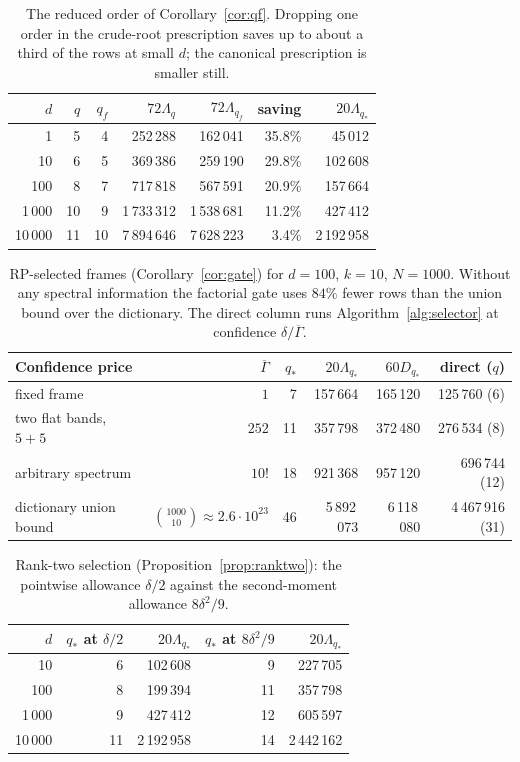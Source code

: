 \documentclass[11pt,a4paper]{article}
\theoremstyle{definition}
\theoremstyle{remark}
\numberwithin{equation}{section}
\begin{document}
\begin{table}[ht]
\centering\small
\begin{tabular}{rrrrrrr}
\toprule
$d$ & $q$ & $q_f$ & $72\Lambda_q$ & $72\Lambda_{q_f}$ & saving & $20\Lambda_{q_*}$\\
\midrule
1 & 5 & 4 & 252\,288 & 162\,041 & 35.8\% & 45\,012\\
10 & 6 & 5 & 369\,386 & 259\,190 & 29.8\% & 102\,608\\
100 & 8 & 7 & 717\,818 & 567\,591 & 20.9\% & 157\,664\\
1\,000 & 10 & 9 & 1\,733\,312 & 1\,538\,681 & 11.2\% & 427\,412\\
10\,000 & 11 & 10 & 7\,894\,646 & 7\,628\,223 & 3.4\% & 2\,192\,958\\
\bottomrule
\end{tabular}
\caption{The reduced order of Corollary~\ref{cor:qf}. Dropping one order in the
crude-root prescription saves up to about a third of the rows at small $d$;
the canonical prescription is smaller still.}
\label{tab:qslack}
\end{table}

\begin{table}[ht]
\centering\small
\begin{tabular}{lrrrrr}
\toprule
Confidence price & $\overline\Gamma$ & $q_*$ & $20\Lambda_{q_*}$ & $60D_{q_*}$ & direct ($q$)\\
\midrule
fixed frame & $1$ & 7 & 157\,664 & 165\,120 & 125\,760 (6)\\
two flat bands, $5+5$ & $252$ & 11 & 357\,798 & 372\,480 & 276\,534 (8)\\
arbitrary spectrum & $10!$ & 18 & 921\,368 & 957\,120 & 696\,744 (12)\\
dictionary union bound & $\binom{1000}{10}\approx2.6\cdot10^{23}$ & 46 & 5\,892\,073 & 6\,118\,080 & 4\,467\,916 (31)\\
\bottomrule
\end{tabular}
\caption{RP-selected frames (Corollary~\ref{cor:gate}) for $d=100$, $k=10$,
$N=1000$. Without any spectral information the factorial gate uses $84\%$
fewer rows than the union bound over the dictionary. The direct column runs
Algorithm~\ref{alg:selector} at confidence $\delta/\overline\Gamma$.}
\label{tab:gate}
\end{table}

\begin{table}[ht]
\centering\small
\begin{tabular}{rrrrr}
\toprule
$d$ & $q_*$ at $\delta/2$ & $20\Lambda_{q_*}$ & $q_*$ at $8\delta^2/9$ & $20\Lambda_{q_*}$\\
\midrule
10 & 6 & 102\,608 & 9 & 227\,705\\
100 & 8 & 199\,394 & 11 & 357\,798\\
1\,000 & 9 & 427\,412 & 12 & 605\,597\\
10\,000 & 11 & 2\,192\,958 & 14 & 2\,442\,162\\
\bottomrule
\end{tabular}
\caption{Rank-two selection (Proposition~\ref{prop:ranktwo}): the pointwise
allowance $\delta/2$ against the second-moment allowance $8\delta^2/9$.}
\label{tab:ranktwo}
\end{table}
\end{document}
